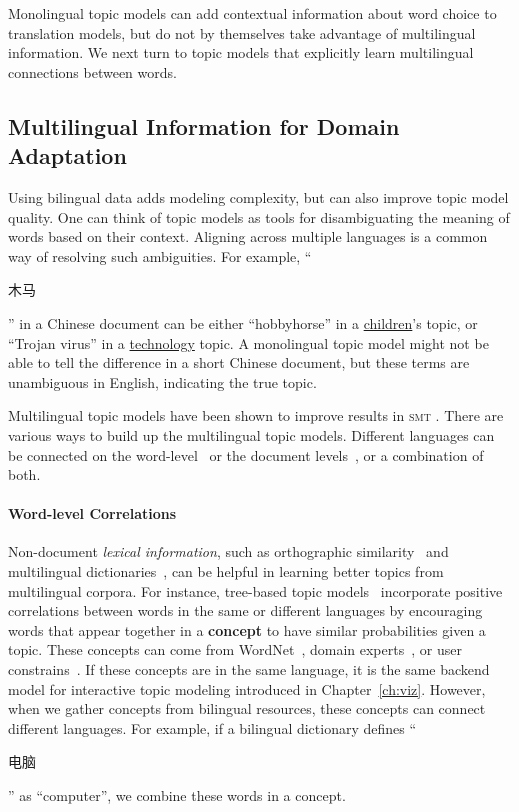 Monolingual topic models can add contextual information about word choice to translation models, but do not by themselves take advantage of multilingual information.
We next turn to topic models that explicitly learn multilingual connections between words.

\subsection{Multilingual Information for Domain Adaptation}
\label{sec:trans-multiling}

Using bilingual data adds modeling complexity, but can also improve topic model quality.
One can think of topic models as tools for disambiguating the meaning of words based on their context. 
Aligning across multiple languages is a common way of resolving such ambiguities.
 For example, ``\begin{CJK*}{UTF8}{gbsn}木马\end{CJK*}'' in a Chinese
  document can be either ``hobbyhorse'' in a \underline{children}'s
  topic, or ``Trojan virus'' in a \underline{technology} topic.  
  A monolingual topic model might not be able to tell the difference in a short Chinese document, but these terms
  are unambiguous in English, indicating the true topic.

Multilingual topic models have been shown to improve results in \textsc{smt} \citet{Eidelman-12}.
There are various ways to build up the multilingual topic
models. Different languages can be connected on the
word-level~\citep{boyd-graber-07,andrzejewski-09,hu-14:itm} or the
document levels~\citep{mimno-09}, or a combination of both\citet{hu-14}. 

\paragraph{\bf Word-level Correlations}

Non-document \emph{lexical information}, such as orthographic
similarity~\citep{boyd-graber-09} and multilingual
dictionaries~\citep{boyd-graber-10}, can be helpful in learning
better topics from multilingual corpora. For instance, tree-based
topic models~\citep[\tlda{}]{boyd-graber-07,andrzejewski-09,hu-14:itm}
incorporate positive correlations between words in the same or
different languages by encouraging words that appear together in a
{\bf concept} to have similar probabilities given a topic. These
concepts can come from WordNet~\citep{boyd-graber-10}, domain
experts~\citep{andrzejewski-09}, or user
constrains~\citep{hu-14:itm}. If these concepts are in the same
language, it is the same backend model for interactive topic modeling
introduced in Chapter~\ref{ch:viz}. However, when we gather concepts
from bilingual resources, these concepts can connect different
languages. For example, if a bilingual dictionary defines
``\begin{CJK*}{UTF8}{gbsn}电脑\end{CJK*}'' as ``computer'', we combine
  these words in a concept.

